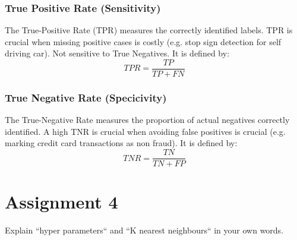 \documentclass{article}
\begin{document}
\subsubsection{True Positive Rate (Sensitivity)}
The True-Positive Rate (TPR) measures the correctly identified labels. TPR is crucial when missing positive cases is costly (e.g. stop sign detection for self driving car). Not sensitive to True Negatives. It is defined by:
\[ TPR = \frac{TP}{TP+FN}\]

\subsubsection{True Negative Rate (Specicivity)}
The True-Negative Rate measures the proportion of actual negatives correctly identified. A high TNR is crucial when avoiding false positives is crucial (e.g. marking credit card transactions as non fraud). It is defined by: 
\[ TNR = \frac{TN}{TN+FP}\]

\section{Assignment 4}
Explain “hyper parameters“ and “K nearest neighbours“ in your own words.
\end{document}
